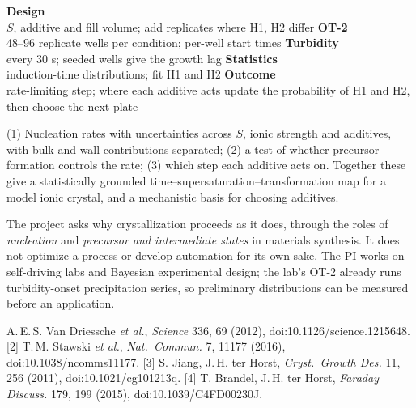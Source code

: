 \documentclass[11pt,letterpaper]{article}
\begin{document}
\wpflow
  {\textbf{Design}\\ $S$, additive and fill volume; add replicates where H1, H2 differ}
  {\textbf{OT-2}\\ 48--96 replicate wells per condition; per-well start times}
  {\textbf{Turbidity}\\ every 30 s; seeded wells give the growth lag}
  {\textbf{Statistics}\\ induction-time distributions; fit H1 and H2}
  {\textbf{Outcome}\\ rate-limiting step; where each additive acts}
  {update the probability of H1 and H2, then choose the next plate}

 (1) Nucleation rates with uncertainties across $S$, ionic strength and
additives, with bulk and wall contributions separated; (2) a test of whether precursor formation
controls the rate; (3) which step each additive acts on. Together these give a statistically
grounded time--supersaturation--transformation map for a model ionic crystal, and a mechanistic basis
for choosing additives.

 The project asks why crystallization proceeds as it does, through the roles
of \emph{nucleation} and \emph{precursor and intermediate states} in materials synthesis. It does not
optimize a process or develop automation for its own sake. The PI works on self-driving labs and
Bayesian experimental design; the lab's OT-2 already runs turbidity-onset precipitation series, so
preliminary distributions can be measured before an application.

\begin{wprefs}
[1] A.\,E.\,S. Van Driessche \emph{et al.}, \emph{Science} 336, 69 (2012), doi:10.1126/science.1215648.
[2] T.\,M. Stawski \emph{et al.}, \emph{Nat.\ Commun.} 7, 11177 (2016), doi:10.1038/ncomms11177.
[3] S. Jiang, J.\,H. ter Horst, \emph{Cryst.\ Growth Des.} 11, 256 (2011), doi:10.1021/cg101213q.
[4] T. Brandel, J.\,H. ter Horst, \emph{Faraday Discuss.} 179, 199 (2015), doi:10.1039/C4FD00230J.
\end{wprefs}
\end{document}
